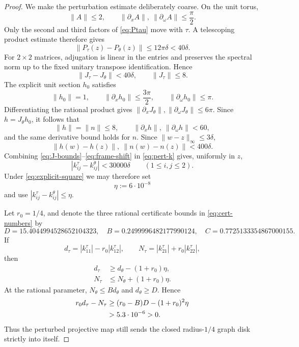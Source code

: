 \documentclass[10pt,a4paper]{amsart}
\begin{document}
\begin{proof}
We make the perturbation estimate deliberately coarse.  On the unit torus,
\begin{equation}\label{eq:A-norms}
 \|A\|\le2,
 \qquad
 \|\partial_xA\|,\ \|\partial_\omega A\|\le\frac\pi2.
\end{equation}
Only the second and third factors of \eqref{eq:Ptau} move with $\tau$.
A telescoping product estimate therefore gives
\begin{equation}\label{eq:P-pert}
 \|P_\tau(z)-P_\theta(z)\|
 \le12\pi\delta<40\delta.
\end{equation}
For $2\times2$ matrices, adjugation is linear in the entries and preserves
the spectral norm up to the fixed unitary transpose identification.  Hence
\begin{equation}\label{eq:J-bounds}
 \|J_\tau-J_\theta\|<40\delta,
 \qquad
 \|J_\tau\|\le8.
\end{equation}
The explicit unit section $h_0$ satisfies
\[
 \|h_0\|=1,
 \qquad
 \|\partial_xh_0\|\le\frac{3\pi}{2},
 \qquad
 \|\partial_\omega h_0\|\le\pi.
\]
Differentiating the rational product gives
$\|\partial_xJ_\theta\|,\|\partial_\omega J_\theta\|\le6\pi$.  Since
$h=J_\theta h_0$, it follows that
\begin{equation}\label{eq:h-bounds}
 \|h\|=\|n\|\le8,
 \qquad
 \|\partial_xh\|,\ \|\partial_\omega h\|<60,
\end{equation}
and the same derivative bound holds for $n$.  Since
$\|w-z\|_\infty\le3\delta$,
\begin{equation}\label{eq:frame-shift}
 \|h(w)-h(z)\|,\ \|n(w)-n(z)\|<400\delta.
\end{equation}
Combining \eqref{eq:J-bounds}--\eqref{eq:frame-shift} in
\eqref{eq:pert-k} gives, uniformly in $z$,
\begin{equation}\label{eq:k-perturbation}
 |k_{ij}^\tau-k_{ij}^\theta|<30000\delta
 \qquad(1\le i,j\le2).
\end{equation}
Under \eqref{eq:explicit-square} we may therefore set
\[
 \eta:=6\cdot10^{-8}
\]
and use $|k_{ij}^\tau-k_{ij}^\theta|\le\eta$.

Let $r_0=1/4$, and denote the three rational certificate bounds in
\eqref{eq:cert-numbers} by
\[
 D=15.4044994528652104323,
 \quad B=0.2499996482177990124,
 \quad C=0.7725133354867000155.
\]
If
\[
 d_\tau=|k_{11}^\tau|-r_0|k_{12}^\tau|,
 \qquad
 N_\tau=|k_{21}^\tau|+r_0|k_{22}^\tau|,
\]
then
\begin{align*}
 d_\tau&\ge d_\theta-(1+r_0)\eta,\\
 N_\tau&\le N_\theta+(1+r_0)\eta.
\end{align*}
At the rational parameter,
$N_\theta\le B d_\theta$ and $d_\theta\ge D$.  Hence
\begin{align}\label{eq:image-margin}
 r_0d_\tau-N_\tau
 &\ge (r_0-B)D-(1+r_0)^2\eta\\
 &>5.3\cdot10^{-6}>0.\notag
\end{align}
Thus the perturbed projective map still sends the closed radius-$1/4$ graph
disk strictly into itself.


\end{proof}
\end{document}
